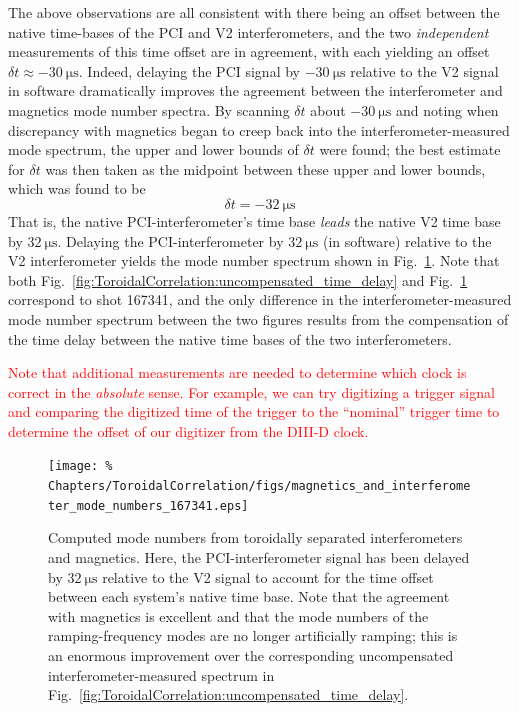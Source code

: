The above observations are all consistent with there being an offset
between the native time-bases of the PCI and V2 interferometers, and
the two \emph{independent} measurements of this time offset are in agreement,
with each yielding an offset $\delta t \approx \SI{-30}{\micro\second}$.
Indeed, delaying the PCI signal by $-\SI{30}{\micro\second}$
relative to the V2 signal in software dramatically improves
the agreement between the interferometer and magnetics mode number spectra.
By scanning $\delta t$ about $-\SI{30}{\micro\second}$ and
noting when discrepancy with magnetics began to creep back into
the interferometer-measured mode spectrum,
the upper and lower bounds of $\delta t$ were found;
the best estimate for $\delta t$ was then taken as the midpoint
between these upper and lower bounds, which was found to be
\begin{equation}
  \delta t = -\SI{32}{\micro\second}
  \label{eq:ToroidalCorrelation:time_delay}
\end{equation}
That is, the native PCI-interferometer's time base \emph{leads}
the native V2 time base by $\SI{32}{\micro\second}$.
Delaying the PCI-interferometer by $\SI{32}{\micro\second}$ (in software)
relative to the V2 interferometer yields the mode number spectrum
shown in Fig.~\ref{fig:ToroidalCorrelation:compensated_time_delay}.
Note that both
Fig.~\ref{fig:ToroidalCorrelation:uncompensated_time_delay} and
Fig.~\ref{fig:ToroidalCorrelation:compensated_time_delay}
correspond to shot 167341, and
the only difference in the interferometer-measured mode number spectrum
between the two figures results from the compensation of the time delay
between the native time bases of the two interferometers.

\textcolor{red}{Note that additional measurements are needed
to determine which clock is correct in the \emph{absolute} sense.
For example, we can try digitizing a trigger signal and
comparing the digitized time of the trigger to the ``nominal'' trigger time
to determine the offset of our digitizer from the DIII-D clock.}

\begin{figure}
  \centering
  \texttt{[image: \%
    Chapters/ToroidalCorrelation/figs/magnetics\_and\_interferometer\_mode\_numbers\_167341.eps]}
  \caption{Computed mode numbers from
    toroidally separated interferometers and magnetics.
    Here, the PCI-interferometer signal has been delayed by
    $\SI{32}{\micro\second}$ relative to the V2 signal
    to account for the time offset between each system's native time base.
    Note that the agreement with magnetics is excellent and that
    the mode numbers of the ramping-frequency modes are no longer
    artificially ramping;
    this is an enormous improvement over the corresponding
    uncompensated interferometer-measured spectrum in
    Fig.~\ref{fig:ToroidalCorrelation:uncompensated_time_delay}.}
\label{fig:ToroidalCorrelation:compensated_time_delay}
\end{figure}


